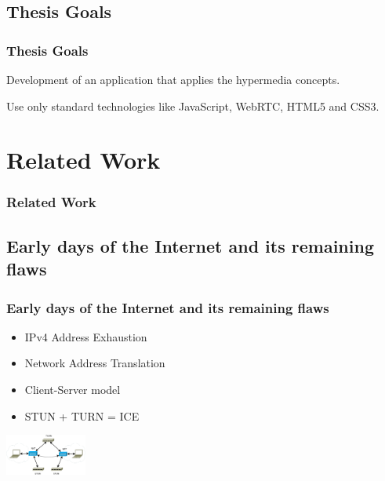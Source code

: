 \documentclass[t]{beamer}
\begin{document}
	\subsection{Thesis Goals} %
  		\begin{frame}[c]
		\frametitle{Thesis Goals}
		Development of an application that applies the hypermedia concepts.

		\vfill

		Use only standard technologies like JavaScript, WebRTC, HTML5 and CSS3.

		\end{frame}


\section{Related Work}\label{related}

\begin{frame}[t,shrink]
\frametitle{Related Work} 

\end{frame}

	\subsection{Early days of the Internet and its remaining flaws}\label{early}


  		\begin{frame}[c]
		\frametitle{Early days of the Internet and its remaining flaws}
		\begin{itemize}
		\item IPv4 Address Exhaustion
		\vfill
		\item Network Address Translation	
		\vfill
		\item Client-Server model
		\vfill
		\item STUN + TURN = ICE
		\end{itemize}
			\begin{flushright}
			\vspace*{-2\baselineskip}
			\includegraphics[width=0.2\textwidth]{figures/ice.png}
		\end{flushright}
		
		\end{frame}
\end{document}
